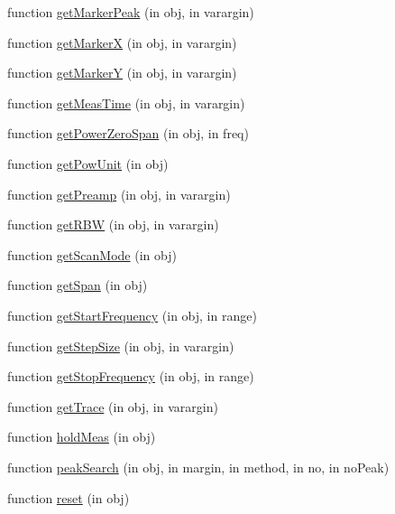 \begin{DoxyCompactItemize}
\item 
function \hyperlink{class_e_s_r_p_a084ee0279ca3eb555192aee73ca31812}{get\+Marker\+Peak} (in obj, in varargin)
\item 
function \hyperlink{class_e_s_r_p_a6a3378410d67cb867eaa7e0a21d92608}{get\+MarkerX} (in obj, in varargin)
\item 
function \hyperlink{class_e_s_r_p_a7a885cf14055f4e53187b18af70cead3}{get\+MarkerY} (in obj, in varargin)
\item 
function \hyperlink{class_e_s_r_p_a8614d3e3448952e41302d0ffbf4c45ab}{get\+Meas\+Time} (in obj, in varargin)
\item 
function \hyperlink{class_e_s_r_p_aab8388f823d3ed38fedffebad3311c7c}{get\+Power\+Zero\+Span} (in obj, in freq)
\item 
function \hyperlink{class_e_s_r_p_afba3dc22407c73186c53b117a2cbc30b}{get\+Pow\+Unit} (in obj)
\item 
function \hyperlink{class_e_s_r_p_af70d83667b9f7ce762e7b38bdee54520}{get\+Preamp} (in obj, in varargin)
\item 
function \hyperlink{class_e_s_r_p_af6552507fd8df19561743916ecd5836e}{get\+R\+BW} (in obj, in varargin)
\item 
function \hyperlink{class_e_s_r_p_aa417a7c94fff0ed9fd9e8efdcee10c5e}{get\+Scan\+Mode} (in obj)
\item 
function \hyperlink{class_e_s_r_p_aac4448bab6ddfb6259226e8619c3a4d9}{get\+Span} (in obj)
\item 
function \hyperlink{class_e_s_r_p_a513cc6b4c35ad418a644bc11c77ade9e}{get\+Start\+Frequency} (in obj, in range)
\item 
function \hyperlink{class_e_s_r_p_ab0cead2c11e6735a1bcdac5c3bc3f0f9}{get\+Step\+Size} (in obj, in varargin)
\item 
function \hyperlink{class_e_s_r_p_ab1809dcdcc90f9f5968a500e375552dd}{get\+Stop\+Frequency} (in obj, in range)
\item 
function \hyperlink{class_e_s_r_p_a4b75c8085d7000162dcc229f23391630}{get\+Trace} (in obj, in varargin)
\item 
function \hyperlink{class_e_s_r_p_a34187373f286c235398d6908a98102db}{hold\+Meas} (in obj)
\item 
function \hyperlink{class_e_s_r_p_a6251b0e88f81201739bf9d10730d32a0}{peak\+Search} (in obj, in margin, in method, in no, in no\+Peak)
\item 
function \hyperlink{class_e_s_r_p_ae3c7c1600173b5dff4a1709a593d7940}{reset} (in obj)
\item 

\end{DoxyCompactItemize}
